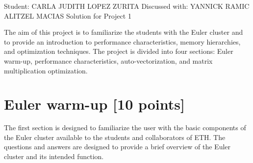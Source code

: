 \documentclass[unicode,11pt,a4paper,oneside,numbers=endperiod,openany]{scrartcl}
\begin{document}
\setassignment
{}

            {Student: CARLA JUDITH LOPEZ ZURITA}
            {Discussed with: YANNICK RAMIC \\
            \hspace*{370pt}ALITZEL MACIAS}
{Solution for Project 1}{}
\newline

\assignmentpolicy

The aim of this project is to familiarize the students with the Euler cluster and to provide an
introduction to performance characteristics, memory hierarchies, and optimization techniques. The
project is divided into four sections: Euler warm-up, performance characteristics, auto-vectorization,
and matrix multiplication optimization.

\section{Euler warm-up [10 points]}

The first section is designed to familiarize the user with the basic components of the Euler cluster
available to the students and collaborators of ETH. The questions and answers are designed to
provide a brief overview of the Euler cluster and its intended function.
\end{document}
